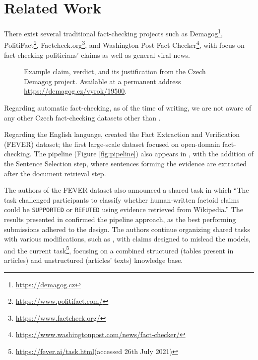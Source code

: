 \section{Related Work}

There exist several traditional fact-checking projects such as Demagog\footnote{\url{https://demagog.cz}}, PolitiFact\footnote{\url{https://www.politifact.com/}}, Factcheck.org\footnote{\url{https://www.factcheck.org/}}, and Washington Post Fact Checker\footnote{\url{https://www.washingtonpost.com/news/fact-checker/}}, with focus on fact-checking politicians' claims as well as general viral news. 

\begin{figure}[h!]
    \caption[Czech Demagog Entry Example]{Example claim, verdict, and its justification from the Czech Demagog project. Available at a permanent address \url{https://demagog.cz/vyrok/19500}.}
\end{figure}

Regarding automatic fact-checking, as of the time of writing, we are not aware of any other Czech fact-checking datasets other than \citep{czech-fact}.

Regarding the English language, \citet{fever} created the Fact Extraction and Verification (FEVER) dataset; the first large-scale dataset focused on open-domain fact-checking.
The pipeline (Figure \ref{fig:pipeline}) also appears in \citep{fever}, with the addition of the Sentence Selection step, where sentences forming the evidence are extracted after the document retrieval step.

The authors of the FEVER dataset also announced a shared task \citep{fever-2018-shared-task} in which ``The task challenged participants to classify whether human-written factoid claims could be \texttt{SUPPORTED} or \texttt{REFUTED} using evidence retrieved from Wikipedia.'' The results presented in \citep{fever-2018-shared-task} confirmed the pipeline approach, as the best performing submissions adhered to the design. The authors continue organizing shared tasks with various modifications, such as \citep{fever-2019-shared-task-adversial}, with claims designed to mislead the models, and the current task\footnote{\url{https://fever.ai/task.html}(accessed 26th July 2021)}, focusing on a combined structured (tables present in articles) and unstructured (articles' texts) knowledge base.



